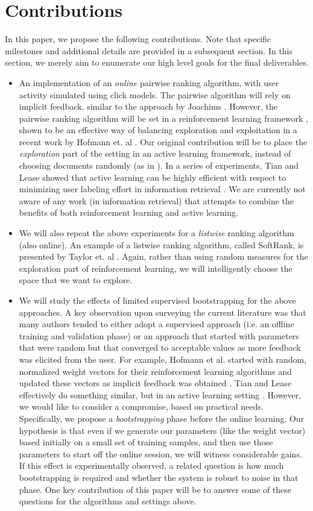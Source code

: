 \documentclass{acm_proc_article-sp}
\begin{document}
\section{Contributions}
In this paper, we propose the following contributions. Note that specific milestones and additional details are provided in a subsequent section. In this section, we merely aim to enumerate our high level goals for the final deliverables.
\begin{itemize}
\item An implementation of an \emph{online} pairwise ranking algorithm, with user activity simulated using click models. The pairwise algorithm will rely on implicit feedback, similar to the approach by Joachims \cite{joachims}. However, the pairwise ranking algorithm will be set in a reinforcement learning framework \cite{rl}, shown to be an effective way of balancing exploration and exploitation in a recent work by Hofmann et. al \cite{hofmann}. Our original contribution will be to place the \emph{exploration} part of the setting in an active learning framework, instead of choosing documents randomly (as in \cite{hofmann}). In a series of experiments, Tian and Lease showed that active learning can be highly efficient with respect to minimizing user labeling effort in information retrieval \cite{aibo}. We are currently not aware of any work (in information retrieval) that attempts to combine the benefits of both reinforcement learning and active learning. 
\item We will also repeat the above experiments for a \emph{listwise} ranking algorithm (also online). An example of a listwise ranking algorithm, called SoftRank, is presented by Taylor et. al \cite{taylor}. Again, rather than using random measures for the exploration part of reinforcement learning, we will intelligently choose the space that we want to explore.
\item We will study the effects of limited supervised bootstrapping for the above approaches. A key observation upon surveying the current literature was that many authors tended to either adopt a supervised approach (i.e. an offline training and validation phase) or an approach that started with parameters that were random but that converged to acceptable values as more feedback was elicited from the user. For example, Hofmann et al. started with random, normalized weight vectors for their reinforcement learning algorithms and updated these vectors as implicit feedback was obtained \cite{hofmann}. Tian and Lease effectively do something similar, but in an active learning setting \cite{aibo}. However, we would like to consider a compromise, based on practical needs. Specifically, we propose a \emph{bootstrapping} phase before the online learning. Our hypothesis is that even if we generate our parameters (like the weight vector) based initially on a small set of training samples, and then use those parameters to start off the online session, we will witness considerable gains. If this effect is experimentally observed, a related question is how much bootstrapping is required and whether the system is robust to noise in that phase. One key contribution of this paper will be to answer some of these questions for the algorithms and settings above.  
\end{itemize}
\end{document}
